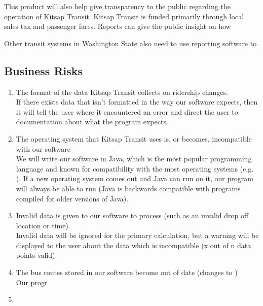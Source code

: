 This product will also help give transparency to the public regarding the operation of Kitsap Transit. Kitsap Transit is funded primarily through local sales tax and passenger fares. Reports can give the public insight on how 

Other transit systems in Washington State also need to use reporting software to 
\raggedbottom
\subsection{Business Risks}
\begin{enumerate}
	\item The format of the data Kitsap Transit collects on ridership changes. \\
	If there exists data that isn't formatted in the way our software expects, then it will tell the user where it encountered an error and direct the user to documentation about what the program expects.
	 
	\item The operating system that Kitsap Transit uses is, or becomes, incompatible with our software \\
	We will write our software in Java, which is the most popular programming language and known for compatibility with the most operating systems (e.g. ). If a new operating system comes out and Java can run on it, our program will always be able to run (Java is backwards compatible with programs compiled for older versions of Java).

	\item Invalid data is given to our software to process (such as an invalid drop off location or time). \\
	Invalid data will be ignored for the primary calculation, but a warning will be displayed to the user about the data which is incompatible (x out of n data points valid).


	\item The bus routes stored in our software become out of date (changes to )\\
	Our progr
	\item 

\end{enumerate}
\raggedbottom
